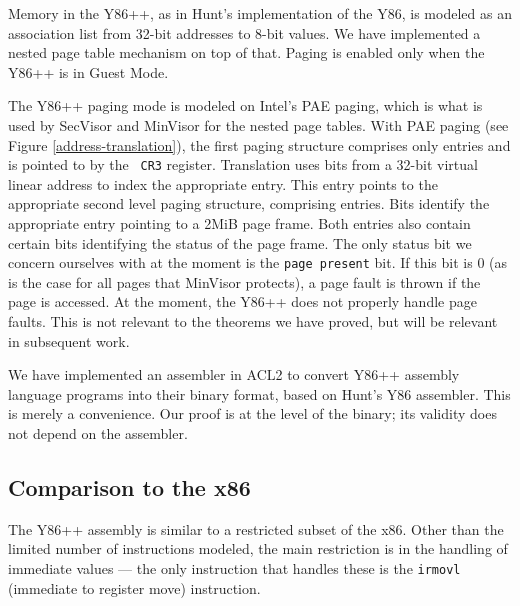 \documentclass[submission,copyright]{eptcs} \providecommand{\event}{ACL2 2011}
\begin{document}
Memory in the Y86++, as in Hunt's implementation of the Y86, is
modeled as an association list from 32-bit addresses to 8-bit values.
We have implemented a nested page table mechanism on top of that.
Paging is enabled only when the Y86++ is in Guest Mode.

The Y86++ paging mode is modeled on Intel's PAE paging, which is what
is used by SecVisor and MinVisor for the nested page tables.  With PAE
paging (see Figure \ref{address-translation}), the first paging
structure comprises only  entries and is pointed to by the {\tt
  CR3} register. Translation uses bits  from a 32-bit virtual
linear address to index the appropriate entry. This entry points to
the appropriate second level paging structure, comprising 
entries.  Bits  identify the appropriate entry pointing to a
2MiB page frame.  Both entries also contain certain bits identifying
the status of the page frame.  The only status bit we concern
ourselves with at the moment is the \texttt{page present} bit.  If this bit
is 0 (as is the case for all pages that MinVisor protects), a page
fault is thrown if the page is accessed.  
At the moment, the Y86++ does not properly handle
page faults. This is not relevant to the theorems we have proved, but
will be relevant in subsequent work.

We have implemented an assembler in ACL2 to convert Y86++ assembly
language programs into their binary format, based on Hunt's Y86
assembler.  This is merely a convenience.  Our proof is at the level
of the binary;  its validity does not depend on the assembler.

\subsection{Comparison to the x86}
\label{Comparison to the x86}

The Y86++ assembly is similar to a restricted subset of the x86.
Other than the limited number of instructions modeled, the main
restriction is in the handling of immediate values --- the only
instruction that handles these is the {\tt irmovl} (immediate to
register move) instruction.  
\end{document}
